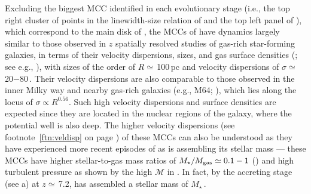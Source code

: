 \IfFileExists{emulateapjlegacy.cls}{\documentclass[iop]{emulateapjlegacy}}{\documentclass[iop]{emulateapj}}
\begin{document}
Excluding the biggest MCC identified in each evolutionary stage (i.e., the top right cluster of points in the 
linewidth-size relation of  and the top left panel of ), which correspond to 
the main disk of \flower, the MCCs of \flower have dynamics largely similar to those observed in
$z$ spatially resolved studies of gas-rich star-forming
galaxies, in terms of their velocity dispersions, sizes, and gas
surface densities (; see e.g.,
\citealt{Swinbank11a}), with sizes of the order of $R\simeq$\,100\,pc
and velocity dispersions of $\sigma\simeq$\,20$-$80\,\kms. 
Their velocity dispersions are also comparable to those observed in the inner Milky way and nearby gas-rich galaxies (e.g., M64; \citealt{Oka01a, Rosolowsky05a, Heyer09a}), which lies along the locus of $\sigma\propto R^{0.56}$. Such high velocity dispersions and surface densities are expected since they are located in the nuclear regions of the galaxy, where the potential well is also deep. The higher velocity dispersions
(see footnote~\ref{ftn:veldisp} on page \pageref{ftn:veldisp}) of
these MCCs can also be understood as they have experienced more recent
episodes of \SF as \flower is assembling its stellar mass --- these MCCs have higher stellar-to-gas mass ratios of $M_\star/M_{\rm gas}\simeq0.1 - 1$ () and high turbulent pressure as shown by the high $\mathcal{M}$ in .  
%
In fact, by the accreting stage (see a) at $z\simeq$\,7.2, 
\flower has assembled a stellar mass of
$M_\star$\,\Msun. 
\end{document}
